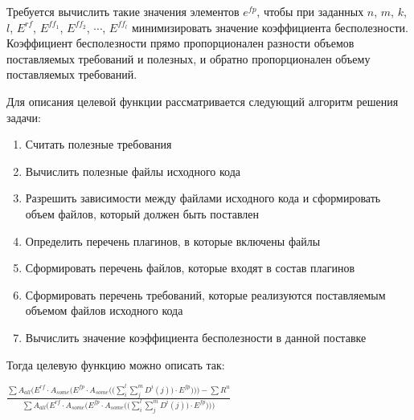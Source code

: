 \documentclass{article}
\begin{document}
  Требуется вычислить такие значения элементов $e^{fp}$, чтобы при заданных $n$, $m$, $k$, $l$, $E^{rf}$, $E^{ff_{1}}$, $E^{ff_{2}}$, $\cdots$, $E^{ff_{l}}$ минимизировать значение коэффициента бесполезности. Коэффициент бесполезности прямо пропорционален разности объемов поставляемых требований и полезных, и обратно пропорционален объему поставляемых требований.

  Для описания целевой функции рассматривается следующий алгоритм решения задачи:
  \begin{enumerate}
    \item Считать полезные требования
    \item Вычислить полезные файлы исходного кода
    \item Разрешить зависимости между файлами исходного кода и сформировать объем файлов, который должен быть поставлен
    \item Определить перечень плагинов, в которые включены файлы
    \item Сформировать перечень файлов, которые входят в состав плагинов
    \item Сформировать перечень требований, которые реализуются поставляемым объемом файлов исходного кода
    \item Вычислить значение коэффициента бесполезности в данной поставке
  \end{enumerate}

  Тогда целевую функцию можно описать так:

  \begin{center}
    $\frac{\displaystyle\sum A_{all}\Bigg(E^{rf} \cdot A_{some}\bigg(E^{fp} \cdot A_{some}\Big(\big(\sum^{l}_{i}\sum^{m}_{j}D^{i}(j)\big) \cdot E^{fp}\Big)\bigg)\Bigg) - \sum R^{u}}{\displaystyle\sum A_{all}\Bigg(E^{rf} \cdot A_{some}\bigg(E^{fp} \cdot A_{some}\Big(\big(\sum^{l}_{i}\sum^{m}_{j}D^{i}(j)\big) \cdot E^{fp}\Big)\bigg)\Bigg)}$
  \end{center}
\end{document}
